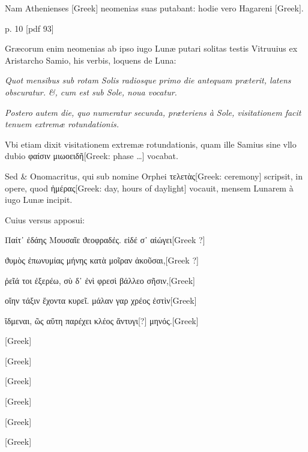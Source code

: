 Nam Athenienses \textgreek{[Greek]} neomenias suas putabant: hodie vero
Hagareni \textgreek{[Greek]}.



p. 10 [pdf 93]



Græcorum enim neomenias ab ipso iugo
Lunæ putari solitas testis Vitruuius ex Aristarcho Samio, his verbis,
loquens de Luna:

\textit{Quot mensibus sub rotam Solis radiosque primo die
antequam præterit, latens obscuratur.}
 \textit{\&, cum est sub Sole, noua vocatur.}

\textit{Postero autem die, quo numeratur secunda,
 præteriens à Sole, visitationem
facit tenuem extremæ rotundationis.}

Vbi etiam dixit visitationem
extremæ rotundationis, quam ille Samius sine vllo dubio
 \textgreek{φαίσιν μιωοειδῆ[Greek: phase …]} vocabat.

Sed \& Onomacritus, qui sub nomine Orphei \textgreek{τελετὰς[Greek: ceremony]}
scripsit, in opere, quod
 \textgreek{ἡμέρας[Greek: day, hours of daylight]}
 vocauit, mensem Lunarem à iugo Lunæ
incipit.

Cuius versus apposui:

\begin{greek}
Παίτ᾽ ἐδάης Μουσαῖε ϑεοφραδἐς. εἰδέ σ᾽ αἰώγει[Greek ?]

ϑυμὸς ἐπωνυμίας μήνης κατὰ μοῖραν ἀκοῦσαι,[Greek ?]

ῤεῖά τοι ἐξερέω, σὺ δ᾽ ἐνὶ φρεσὶ βάλλεο σῆσιν,[Greek] 

οἵην τάξιν ἔχοντα κυρεῖ. μάλαν γαρ χρέος ἐστὶν[Greek]

ἴδμεναι, ῶς αὕτη παρέχει κλέος ἄντυγι[?] μηνός.[Greek]

\textgreek{[Greek]}

\textgreek{[Greek]}

\textgreek{[Greek]}

\textgreek{[Greek]}

\textgreek{[Greek]}

\textgreek{[Greek]}
\end{greek}

